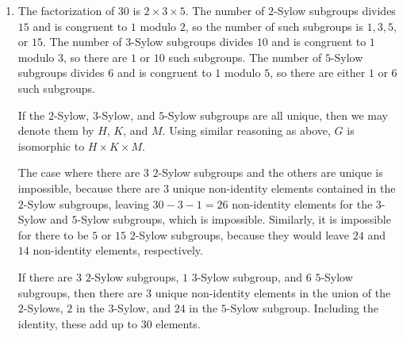 \documentclass[a4paper,12pt]{article}
\begin{document}
\begin{enumerate}
\begin{enumerate}
            \item
                The factorization of $30$ is $2 \times 3 \times 5$. The number of $2$-Sylow subgroups divides $15$ and is congruent to $1$ modulo $2$, so the number of such subgroups is $1, 3, 5,$ or $15$. The number of $3$-Sylow subgroups divides $10$ and is congruent to $1$ modulo $3$, so there are $1$ or $10$ such subgroups. The number of $5$-Sylow subgroups divides $6$ and is congruent to $1$ modulo $5$, so there are either $1$ or $6$ such subgroups. \par
                If the $2$-Sylow, $3$-Sylow, and $5$-Sylow subgroups are all unique, then we may denote them by $H$, $K$, and $M$. Using similar reasoning as above, $G$ is isomorphic to $H \times K \times M$. \par
                The case where there are $3$ $2$-Sylow subgroups and the others are unique is impossible, because there are $3$ unique non-identity elements contained in the $2$-Sylow subgroups, leaving $30 - 3 - 1 = 26$ non-identity elements for the $3$-Sylow and $5$-Sylow subgroups, which is impossible. Similarly, it is impossible for there to be $5$ or $15$ $2$-Sylow subgroups, because they would leave $24$ and $14$ non-identity elements, respectively. \par
                If there are $3$ $2$-Sylow subgroups, $1$ $3$-Sylow subgroup, and $6$ $5$-Sylow subgroups, then there are $3$ unique non-identity elements in the union of the $2$-Sylows, $2$ in the $3$-Sylow, and $24$ in the $5$-Sylow subgroup. Including the identity, these add up to $30$ elements.
        \end{enumerate}
\end{enumerate}
\end{document}
